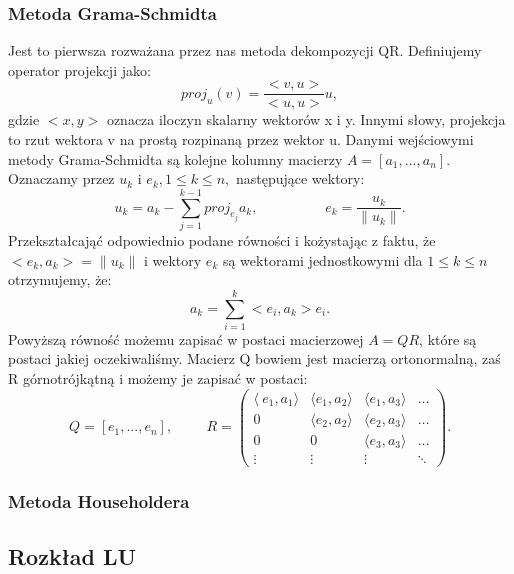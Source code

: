 \subsubsection{Metoda Grama-Schmidta}
Jest to pierwsza rozważana przez nas metoda dekompozycji QR. Definiujemy
operator projekcji jako:
$$proj_u(v)=\frac{<v,u>}{<u,u>}u,$$
gdzie $<x,y>$ oznacza iloczyn skalarny wektorów x i y. Innymi słowy, projekcja
to rzut wektora v na prostą rozpinaną przez wektor u. Danymi wejściowymi
metody Grama-Schmidta są kolejne kolumny macierzy $A=[a_1,...,a_n]$.
Oznaczamy przez ${u_k}$ i ${e_k}, 1 \leq k \leq n,$ następujące wektory:
$$ u_k = a_k-\sum_{j=1}^{k-1} proj_{e_j}a_k, \hspace{2cm}
e_k = \frac{u_k}{\|u_k\|}.$$
Przekształcająć odpowiednio podane równości i kożystając z faktu, że
$<e_k, a_k> = \|u_k\|$ i wektory $e_k$ są wektorami jednostkowymi dla
$1 \leq k \leq n$ otrzymujemy, że:
$$ a_k = \sum_{i=1}^{k} <e_i,a_k>e_i.$$
Powyższą równość możemu zapisać w postaci macierzowej $A=QR$, które są
postaci jakiej oczekiwaliśmy. Macierz Q bowiem jest macierzą ortonormalną,
zaś R górnotrójkątną i możemy je zapisać w postaci:
$$ Q = [e_1,...,e_n], \hspace{1cm} R = \begin{pmatrix} \langle\ e_1,a_1
\rangle & \langle e_1,a_2\rangle & \langle e_1, a_3\rangle & \ldots \\ 0
& \langle e_2, a_2\rangle & \langle e_2, a_3\rangle & \ldots \\ 0 & 0 &
\langle e_3, a_3\rangle & \ldots \\ \vdots & \vdots & \vdots & \ddots
\end{pmatrix}.$$
\subsubsection{Metoda Householdera}
\subsection{Rozkład LU}
